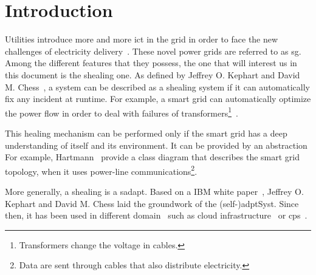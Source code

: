 \section{Introduction}

Utilities introduce more and more \gls{ict} in the grid in order to face the new challenges of electricity delivery~\cite{farhangi2010path, ipakchi2009grid, DBLP:journals/comsur/FangMXY12}.
These novel power grids are referred to as \gls{sg}.
Among the different features that they possess, the one that will interest us in this document is the \gls{shealing} one.
As defined by Jeffrey O. Kephart and David M. Chess~\cite{DBLP:journals/computer/KephartC03}, a system can be described as a \gls{shealing} system if it can automatically fix any incident at runtime.
For example, a smart grid can automatically optimize the power flow in order to deal with failures of transformers\footnote{Transformers change the voltage in cables.}~\cite{DBLP:journals/comsur/FangMXY12}.

This healing mechanism can be performed only if the smart grid has a deep understanding of itself and its environment.
It can be provided by an abstraction 
For example, Hartmann~\etal \cite{DBLP:conf/smartgridcomm/0001FKTPTR14} provide a class diagram that describes the smart grid topology, when it uses power-line communications\footnote{Data are sent through cables that also distribute electricity.}.

\bigskip

More generally, a \gls{shealing} is a \gls{sadapt}. 
Based on a IBM white paper~\cite{computing2006architectural}, Jeffrey O. Kephart and David M. Chess laid the groundwork of the (self-)\gls{adptSyst}.
Since then, it has been used in different domain~\cite{DBLP:journals/corr/abs-1904-01518} such as cloud infrastructure~\cite{DBLP:conf/icac/JavadiG17, OpenStack:Watcher:Wiki, DBLP:conf/icse/BarnaKFL17} or \gls{cps}~\cite{DBLP:conf/icac/LalandaGC17, DBLP:conf/cbse/FouquetMFBPJ12, DBLP:conf/smartgridsec/0001FKNT14}.

 












